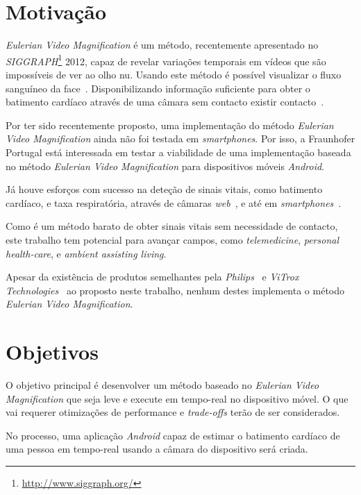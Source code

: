 \documentclass[9pt,a4paper]{extarticle}
\newcommand{\evm}{\emph{Eulerian Video Magnification}}
\begin{document}
\begin{multicols}{2}

\section{Motivação}\label{sec:motivation}

\evm{} é um método, recentemente apresentado no
\emph{SIGGRAPH}\footnote{\url{http://www.siggraph.org/}} 2012, capaz de revelar
variações temporais em vídeos que são impossíveis de ver ao olho nu. Usando
este método é possível visualizar o fluxo sanguíneo da
face~\cite{Wu2012Eulerian}. Disponibilizando informação suficiente
para obter o batimento cardíaco através de uma câmara sem contacto existir
contacto~\cite{Wu2012Eulerian, Poh2010Non, Poh2011Advancements}.

Por ter sido recentemente proposto, uma implementação do método \evm{} ainda
não foi testada em \emph{smartphones}. Por isso, a Fraunhofer Portugal
está interessada em testar a viabilidade de uma implementação baseada
no método \evm{} para dispositivos móveis \emph{Android}.

Já houve esforços com sucesso na deteção de sinais vitais, como
batimento cardíaco, e taxa respiratória, através de câmaras
\emph{web}~\cite{Wu2012Eulerian, Poh2010Non, Poh2011Advancements}, e até
em \emph{smartphones}~\cite{Vitrox2013, Philips2013}.

Como é um método barato de obter sinais vitais sem necessidade de contacto,
este trabalho tem potencial para avançar campos, como \emph{telemedicine},
\emph{personal health-care}, e \emph{ambient assisting living}.

Apesar da existência de produtos semelhantes pela
\emph{Philips}~\cite{Philips2013} e \emph{ViTrox Technologies}~\cite{Vitrox2013}
ao proposto neste trabalho, nenhum destes implementa o método \evm{}.

\section{Objetivos}\label{sec:objectives}

O objetivo principal é desenvolver um método baseado no \evm{} que seja
leve e execute em tempo-real no dispositivo móvel. O que vai requerer
otimizações de performance e \emph{trade-offs} terão de ser considerados.

No processo, uma aplicação \emph{Android} capaz de estimar o batimento
cardíaco de uma pessoa em tempo-real usando a câmara do dispositivo
será criada.


\end{multicols}
\end{document}
